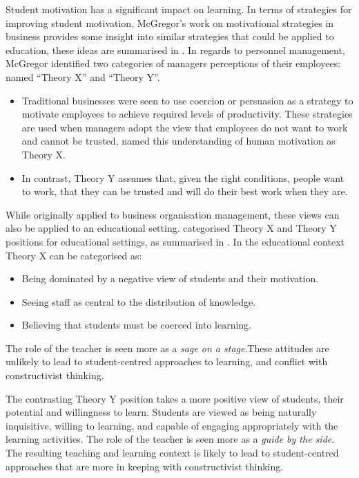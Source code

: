 %
%


Student motivation has a significant impact on learning. In terms of strategies for improving student motivation, McGregor's work on motivational strategies in business \cite{McGregor:1960} provides some insight into similar strategies that could be applied to education, these ideas are summarised in .  In regards to personnel management, McGregor identified two categories of managers perceptions of their employees: named ``Theory X'' and ``Theory Y''. 

\begin{itemize}[noitemsep,nolistsep]
	\item Traditional businesses were seen to use coercion or persuasion as a strategy to motivate employees to achieve required levels of productivity. These strategies are used when managers adopt the view that employees do not want to work and cannot be trusted, \citet{McGregor:1960} named this understanding of human motivation as Theory X. 
	\item In contrast, Theory Y assumes that, given the right conditions, people want to work, that they can be trusted and will do their best work when they are.
\end{itemize}


While originally applied to business organisation management, these views can also be applied to an educational setting. \citet{Markwell:2004} categorised Theory X and Theory Y positions for educational settings, as summarised in . In the educational context Theory X can be categorised as:

\begin{itemize}[noitemsep,nolistsep]
	\item Being dominated by a negative view of students and their motivation. 
	\item Seeing staff as central to the distribution of knowledge.
	\item Believing that students must be coerced into learning. 
\end{itemize}

The role of the teacher is seen more as a \emph{sage on a stage}.These attitudes are unlikely to lead to student-centred approaches to learning, and conflict with constructivist thinking.

The contrasting Theory Y position takes a more positive view of students, their potential and willingness to learn. Students are viewed as being naturally inquisitive, willing to learning, and capable of engaging appropriately with the learning activities. The role of the teacher is seen more as a \emph{guide by the side}. The resulting teaching and learning context is likely to lead to student-centred approaches that are more in keeping with constructivist thinking.

